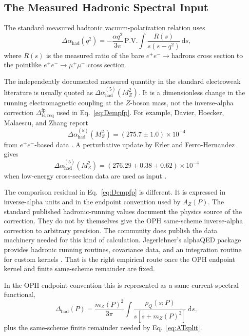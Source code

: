 \documentclass[11pt]{article}
\theoremstyle{remark}
\newcommand{\dd}{\,\mathrm d}
\newcommand{\AZ}{A_Z}
\newcommand{\Dhad}{\Delta_{\mathrm{had}}}
\newcommand{\Dhadreq}{\Delta_{\mathrm{H,req}}}
\begin{document}
\subsection{The Measured Hadronic Spectral Input}
\label{sec:alpha-step-20}

The standard measured hadronic vacuum-polarization relation uses
\begin{equation}
\Delta\alpha_{\mathrm{had}}(q^2)
=
-\frac{\alpha q^2}{3\pi}\,
\mathrm{P.V.}\!\int \frac{R(s)}{s(s-q^2)}\dd s,
\label{eq:dispersion}
\end{equation}
where \(R(s)\) is the measured ratio of the bare \(e^+e^-\to\mathrm{hadrons}\) cross section to the pointlike \(e^+e^-\to\mu^+\mu^-\) cross section.

The independently documented measured quantity in the standard electroweak literature is usually quoted as \(\Delta\alpha_{\mathrm{had}}^{(5)}(M_Z^2)\). It is a dimensionless change in the running electromagnetic coupling at the \(Z\)-boson mass, not the inverse-alpha correction \(\Dhadreq^{\mathrm{fp}}\) used in Eq.~\eqref{eq:Dempfp}. For example, Davier, Hoecker, Malaescu, and Zhang report
\[
\Delta\alpha_{\mathrm{had}}^{(5)}(M_Z^2)=(275.7\pm1.0)\times10^{-4}
\]
from \(e^+e^-\)-based data \cite{dhmz}. A perturbative update by Erler and Ferro-Hernandez gives
\[
\Delta\alpha_{\mathrm{had}}^{(5)}(M_Z^2)
=\left(276.29\pm0.38\pm0.62\right)\times10^{-4}
\]
when low-energy cross-section data are used as input \cite{erler-ferro}.

The comparison residual in Eq.~\eqref{eq:Dempfp} is different. It is expressed in inverse-alpha units and in the endpoint convention used by \(\AZ(P)\). The standard published hadronic-running values document the physics source of the correction. They do not by themselves give the OPH same-scheme inverse-alpha correction to arbitrary precision. The community does publish the data machinery needed for this kind of calculation. Jegerlehner's alphaQED package provides hadronic running routines, covariance data, and an integration routine for custom kernels \cite{alphaqed}. That is the right empirical route once the OPH endpoint kernel and finite same-scheme remainder are fixed.

In the OPH endpoint convention this is represented as a same-current spectral functional,
\begin{equation}
\Dhad(P)
=
\frac{m_Z(P)^2}{3\pi}
\int \frac{\rho_Q(s;P)}{s[s+m_Z(P)^2]}\dd s,
\label{eq:ophhadron}
\end{equation}
plus the same-scheme finite remainder needed by Eq.~\eqref{eq:ATsplit}.
\end{document}
